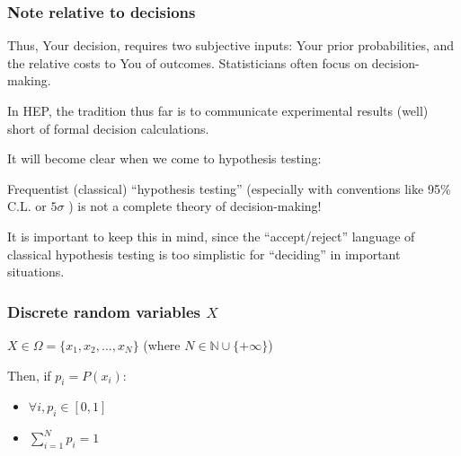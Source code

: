 \documentclass[9pt]{beamer}
\newif\ifmynote
\newcommand\mynote[1]{%
\ifmynote \textbf{#1} \else \fi
}
\begin{document}
\begin{frame}
\frametitle{Note relative to decisions}

Thus, Your decision, requires two subjective inputs: Your prior
probabilities, and the relative costs to You of outcomes.
Statisticians often focus on decision-making.

In HEP, the tradition thus far is to communicate experimental
results (well) short of formal decision calculations.

It will become clear when we come to hypothesis testing: 

Frequentist (classical) ``hypothesis testing'' (especially with
conventions like 95\% C.L. or $5\sigma$ ) is not a complete theory of
decision-making!

It is important to keep this in mind, since the ``accept/reject''
language of classical hypothesis testing is too
simplistic for ``deciding'' in important situations.

\end{frame}


\begin{frame}
 \frametitle{Discrete random variables $X$}
 
 \mynote{Écrire au tableau}
 
  $X \in \Omega = \{ x_1, x_2, \dots, x_N \}$ (where $N \in \mathbb{N} \cup \{+\infty\}$)
  
  Then, if $p_i = P(x_i)$:
  
  \begin{itemize}
   \item $\forall i, p_i \in [0,1]$
   \item $\sum_{i=1}^N p_i = 1$
  \end{itemize}

 \end{frame}
 
\end{document}
